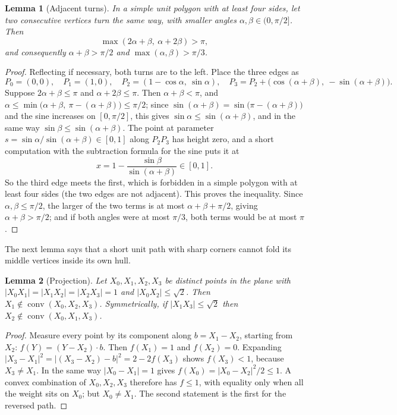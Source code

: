 \documentclass[11pt]{article}
\newtheorem{lemma}{Lemma}
\theoremstyle{remark}
\DeclareMathOperator{\conv}{conv}
\begin{document}
\begin{lemma}[Adjacent turns]\label{lem:turns}
In a simple unit polygon with at least four sides, let two consecutive vertices turn the
same way, with smaller angles $\alpha,\beta\in(0,\pi/2]$. Then
\[
  \max(2\alpha+\beta,\ \alpha+2\beta)>\pi,
\]
and consequently $\alpha+\beta>\pi/2$ and $\max(\alpha,\beta)>\pi/3$.
\end{lemma}

\begin{proof}
Reflecting if necessary, both turns are to the left. Place the three edges as
\[
  P_0=(0,0),\quad P_1=(1,0),\quad P_2=(1-\cos\alpha,\ \sin\alpha),\quad
  P_3=P_2+\bigl(\cos(\alpha+\beta),\ -\sin(\alpha+\beta)\bigr).
\]
Suppose $2\alpha+\beta\le\pi$ and $\alpha+2\beta\le\pi$. Then $\alpha+\beta<\pi$, and
$\alpha\le\min\bigl(\alpha+\beta,\ \pi-(\alpha+\beta)\bigr)\le\pi/2$; since
$\sin(\alpha+\beta)=\sin\bigl(\pi-(\alpha+\beta)\bigr)$ and the sine increases on $[0,\pi/2]$, this gives
$\sin\alpha\le\sin(\alpha+\beta)$, and in the same way $\sin\beta\le\sin(\alpha+\beta)$. The point at parameter
$s=\sin\alpha/\sin(\alpha+\beta)\in[0,1]$ along $P_2P_3$ has height zero, and a short computation
with the subtraction formula for the sine puts it at
\[
  x=1-\frac{\sin\beta}{\sin(\alpha+\beta)}\in[0,1].
\]
So the third edge meets the first, which is forbidden in a simple polygon with at least
four sides (the two edges are not adjacent). This proves the inequality. Since
$\alpha,\beta\le\pi/2$, the larger of the two terms is at most $\alpha+\beta+\pi/2$, giving
$\alpha+\beta>\pi/2$; and if both angles were at most $\pi/3$, both terms would be at most
$\pi$.
\end{proof}

The next lemma says that a short unit path with sharp corners cannot fold its middle
vertices inside its own hull.

\begin{lemma}[Projection]\label{lem:projection}
Let $X_0,X_1,X_2,X_3$ be distinct points in the plane with
$|X_0X_1|=|X_1X_2|=|X_2X_3|=1$ and
$|X_0X_2|\le\sqrt2$. Then $X_1\notin\conv(X_0,X_2,X_3)$. Symmetrically, if
$|X_1X_3|\le\sqrt2$ then $X_2\notin\conv(X_0,X_1,X_3)$.
\end{lemma}

\begin{proof}
Measure every point by its component along $b=X_1-X_2$, starting from $X_2$:
$f(Y)=(Y-X_2)\cdot b$. Then $f(X_1)=1$ and $f(X_2)=0$. Expanding
$|X_3-X_1|^2=|(X_3-X_2)-b|^2=2-2f(X_3)$ shows $f(X_3)<1$, because $X_3\ne X_1$. In the
same way $|X_0-X_1|=1$ gives $f(X_0)=|X_0-X_2|^2/2\le1$. A convex combination of
$X_0,X_2,X_3$ therefore has $f\le1$, with equality only when all the weight sits on
$X_0$; but $X_0\ne X_1$. The second statement is the first for the reversed path.
\end{proof}
\end{document}
